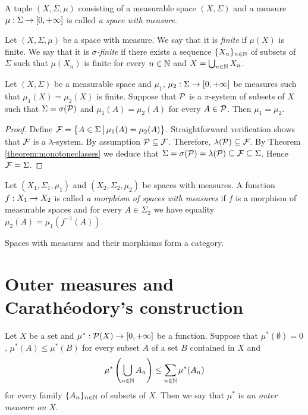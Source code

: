\begin{definition}
A tuple $(X,\Sigma,\mu)$ consisting of a measurable space $\left(X,\Sigma\right)$ and a measure $\mu:\Sigma \rightarrow [0,+\infty]$ is called \textit{a space with measure}.
\end{definition}

\begin{definition}
Let $(X,\Sigma,\mu)$ be a space with measure. We say that it is \textit{finite} if $\mu(X)$ is finite. We say that it is \textit{$\sigma$-finite} if there exists a sequence $\{X_n\}_{n\in {\mathbb N}}$ of subsets of $\Sigma$ such that $\mu(X_n)$ is finite for every $n\in {\mathbb N}$ and $X=\bigcup_{n\in {\mathbb N}}X_n$.
\end{definition}

\begin{theorem}\label{theorem:uniquenessonpisystem}
Let $(X,\Sigma)$ be a measurable space and $\mu_1$, $\mu_2:\Sigma\rightarrow [0,+\infty]$ be measures such that $\mu_1(X)=\mu_2(X)$ is finite. Suppose that ${\mathcal P}$ is a $\pi$-system of subsets of $X$ such that $\Sigma=\sigma({\mathcal P})$ and $\mu_1(A)=\mu_2(A)$ for every $A\in {\mathcal P}$. Then $\mu_1=\mu_2$.
\end{theorem}
\begin{proof}
Define ${\mathcal F}=\big\{A\in \Sigma\,\big|\,\mu_1(A)=\mu_2(A)\big\}$. Straightforward verification shows that ${\mathcal F}$ is a $\lambda$-system. By assumption ${\mathcal P}\subseteq {\mathcal F}$. Therefore, $\lambda({\mathcal P})\subseteq {\mathcal F}$. By Theorem \ref{theorem:monotoneclasses} we deduce that $\Sigma=\sigma({\mathcal P})=\lambda({\mathcal P})\subseteq {\mathcal F}\subseteq \Sigma$. Hence ${\mathcal F}=\Sigma$.
\end{proof}

\begin{definition}
Let $(X_1,\Sigma_1,\mu_1)$ and $(X_2,\Sigma_2,\mu_2)$ be spaces with measures. A function $f:X_1\rightarrow X_2$ is called \textit{a morphism of spaces with measures} if $f$ is a morphism of measurable spaces and for every $A\in \Sigma_2$ we have equality $\mu_2(A)=\mu_1(f^{-1}(A))$.
\end{definition}
\noindent
Spaces with measures and their morphisms form a category.

\section{Outer measures and Carath{\'e}odory's construction}

\begin{definition}
Let $X$ be a set and $\mu^*:{\mathcal P}(X)\rightarrow [0,+\infty]$ be a function. Suppose that $\mu^*(\emptyset)=0$, $\mu^*(A)\leq \mu^*(B)$ for every subset $A$ of a set $B$ contained in $X$ and 
$$\mu^*\left(\bigcup_{n\in {\mathbb N}}A_n\right)\leq \sum_{n\in {\mathbb N}}\mu^*(A_n)$$ 
for every family  $\{A_n\}_{n\in {\mathbb N}}$ of subsets of $X$. Then we say that $\mu^*$ is \textit{an outer measure on $X$}.
\end{definition}

